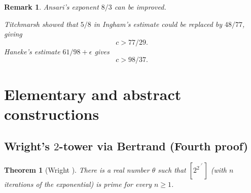 \documentclass[11pt,reqno]{amsart}
\theoremstyle{redplain}
\newtheorem{theorem}{Theorem}[section]
\newtheorem{remark}{Remark}[section]
\numberwithin{equation}{section}
\begin{document}
\begin{remark}
Ansari's exponent $8/3$ can be improved.

\noindent%
Titchmarsh showed that $5/8$ in Ingham's estimate could be replaced by $%
48/77 $, giving 
\begin{equation}
c>77/29.
\end{equation}%
\noindent%
Haneke's estimate $61/98+\epsilon $ gives 
\begin{equation}
c>98/37.
\end{equation}
\end{remark}


\section{Elementary and abstract constructions}

\label{sec:elementary}

\subsection{Wright's $2$-tower via Bertrand (Fourth proof)}

\label{sec:wright}

\begin{theorem}[Wright \protect\cite{Wright1951}]
\label{thm:wright} There is a real number $\theta $ such that $[2^{2^{\cdot
^{\cdot ^{2^{\theta }}}}}]$ (with $n$ iterations of the exponential) is
prime for every $n\geq 1$.%
\begin{equation*}
\end{equation*}
\end{theorem}
\end{document}
